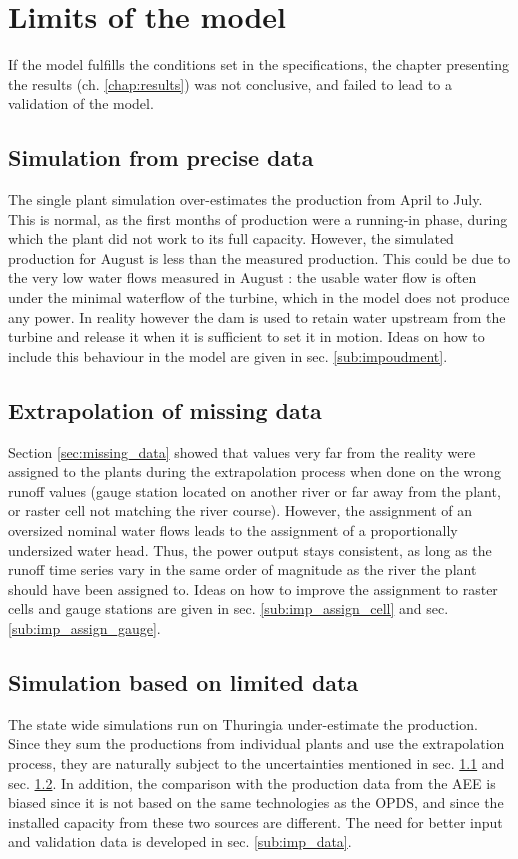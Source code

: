 \section{Limits of the model}
\label{sec:limits}
If the model fulfills the conditions set in the specifications, the chapter presenting the results (ch. \ref{chap:results}) was not conclusive, and failed to lead to a validation of the model.
\subsection{Simulation from precise data}
\label{sub:lim_single}
The single plant simulation over-estimates the production from April to July. This is normal, as the first months of production were a running-in phase, during which the plant did not work to its full capacity. However, the simulated production for August is less than the measured production. This could be due to the very low water flows measured in August : the usable water flow is often under the minimal waterflow of the turbine, which in the model does not produce any power. In reality however the dam is used to retain water upstream from the turbine and release it when it is sufficient to set it in motion. Ideas on how to include this behaviour in the model are given in sec. \ref{sub:impoudment}.

\subsection{Extrapolation of missing data}
\label{sub:lim_extra}
Section \ref{sec:missing_data} showed that values very far from the reality were assigned to the plants during the extrapolation process when done on the wrong runoff values (gauge station located on another river or far away from the plant, or raster cell not matching the river course). However, the assignment of an oversized nominal water flows leads to the assignment of a proportionally undersized water head. Thus, the power output stays consistent, as long as the runoff time series vary in the same order of magnitude as the river the plant should have been assigned to. Ideas on how to improve the assignment to raster cells and gauge stations are given in sec. \ref{sub:imp_assign_cell} and sec. \ref{sub:imp_assign_gauge}.

\subsection{Simulation based on limited data}
\label{sub:lim_data}
The state wide simulations run on Thuringia under-estimate the production. Since they sum the productions from individual plants and use the extrapolation process, they are naturally subject to the uncertainties mentioned in sec. \ref{sub:lim_single} and sec. \ref{sub:lim_extra}. In addition, the comparison with the production data from the AEE is biased since it is not based on the same technologies as the OPDS, and since the installed capacity from these two sources are different. The need for better input and validation data is developed in sec. \ref{sub:imp_data}.

